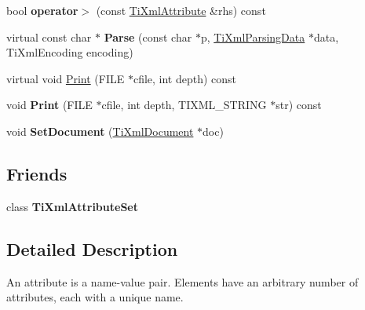 \begin{DoxyCompactItemize}
\item 
\hypertarget{class_ti_xml_attribute_a867562769ef9778c1690cd373246b05b}{
bool {\bfseries operator$>$} (const \hyperlink{class_ti_xml_attribute}{\-Ti\-Xml\-Attribute} \&rhs) const }
\label{class_ti_xml_attribute_a867562769ef9778c1690cd373246b05b}

\item 
\hypertarget{class_ti_xml_attribute_ad62774421b814894b995af3b5d231dda}{
virtual const char $\ast$ {\bfseries \-Parse} (const char $\ast$p, \hyperlink{class_ti_xml_parsing_data}{\-Ti\-Xml\-Parsing\-Data} $\ast$data, \-Ti\-Xml\-Encoding encoding)}
\label{class_ti_xml_attribute_ad62774421b814894b995af3b5d231dda}

\item 
virtual void \hyperlink{class_ti_xml_attribute_acc04956c1d5c4c31fe74f7a7528d109a}{\-Print} (\-F\-I\-L\-E $\ast$cfile, int depth) const 
\item 
\hypertarget{class_ti_xml_attribute_a19e6b6862a80b188571c47947e88d030}{
void {\bfseries \-Print} (\-F\-I\-L\-E $\ast$cfile, int depth, \-T\-I\-X\-M\-L\-\_\-\-S\-T\-R\-I\-N\-G $\ast$str) const }
\label{class_ti_xml_attribute_a19e6b6862a80b188571c47947e88d030}

\item 
\hypertarget{class_ti_xml_attribute_ac12a94d4548302afb12f488ba101f7d1}{
void {\bfseries \-Set\-Document} (\hyperlink{class_ti_xml_document}{\-Ti\-Xml\-Document} $\ast$doc)}
\label{class_ti_xml_attribute_ac12a94d4548302afb12f488ba101f7d1}

\end{DoxyCompactItemize}
\subsection*{\-Friends}
\begin{DoxyCompactItemize}
\item 
\hypertarget{class_ti_xml_attribute_a35a7b7f89f708527677d5078d41ce0bf}{
class {\bfseries \-Ti\-Xml\-Attribute\-Set}}
\label{class_ti_xml_attribute_a35a7b7f89f708527677d5078d41ce0bf}

\end{DoxyCompactItemize}


\subsection{\-Detailed \-Description}
\-An attribute is a name-\/value pair. \-Elements have an arbitrary number of attributes, each with a unique name.

